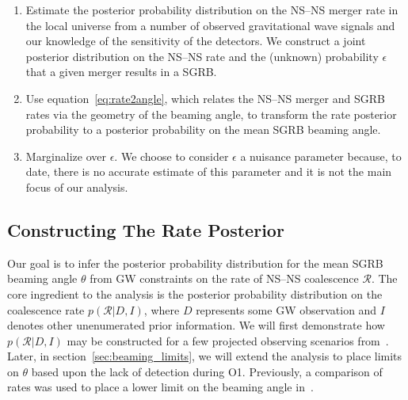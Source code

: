 \documentclass[twocolumn]{aastex61}
\newcommand{\cbcrate}{{{\mathcal R}}}
\newcommand{\BNS}{\ac{NS}--\ac{NS}\xspace}
\begin{document}
\begin{enumerate}
    \item Estimate the posterior probability distribution on the \BNS merger rate
    in the local universe from a number of observed gravitational wave signals
    and our knowledge of the sensitivity of the detectors.  We construct a joint
    posterior distribution on the \BNS rate and the (unknown) probability
    $\epsilon$ that a given merger results in a \ac{SGRB}.
\item Use equation~\ref{eq:rate2angle}, which relates the \BNS merger and
    \ac{SGRB} rates via the geometry of the beaming angle, to transform the rate
    posterior probability to a posterior probability on the mean \ac{SGRB}
    beaming angle.
\item Marginalize over $\epsilon$. We choose to consider $\epsilon$ a nuisance
    parameter because, to date, there is no accurate estimate of this parameter
    and it is not the main focus of our analysis. 
\end{enumerate}


\subsection{Constructing The Rate Posterior}
\label{sec:rate_posterior}


Our goal is to infer the posterior probability distribution for the mean
\ac{SGRB} beaming angle $\theta$ from \ac{GW} constraints on the rate of \BNS
coalescence $\cbcrate$.  The core ingredient to the analysis is the posterior
probability distribution on the coalescence rate $p(\cbcrate|D,I)$, where $D$
represents some \ac{GW} observation and $I$ denotes other unenumerated prior
information.  We will first demonstrate how $p(\cbcrate|D,I)$ may be constructed
for a few projected observing scenarios from~\cite{Aasi:2013wya}.  Later, in
section~\ref{sec:beaming_limits}, we will extend the analysis to place
limits on $\theta$ based upon the lack of detection during O1. Previously, a
comparison of rates was used to place a lower limit on the beaming angle
in~\cite{Abbott:2016ymx}.
\end{document}

